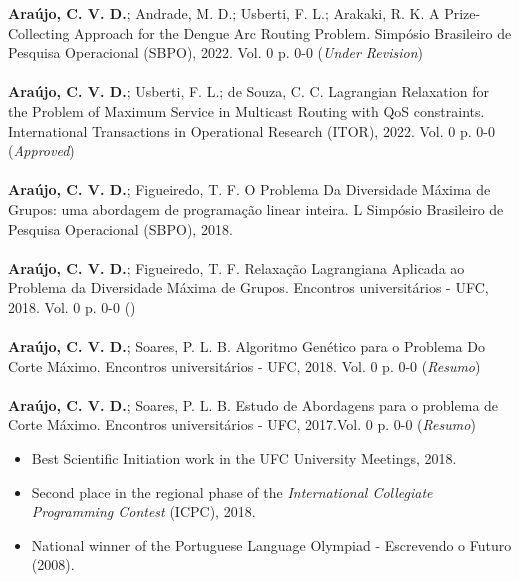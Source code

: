 \documentclass[10pt,a4paper,ragged2e,withhyper]{altacv}
\begin{document}
\begin{paracol}{1}
        \medskip
        \textbf{Araújo, C. V. D.}; Andrade, M. D.; Usberti, F. L.; Arakaki, R. K.
        \textcolor{SecondaryColor}{A Prize-Collecting Approach for the Dengue
          Arc Routing Problem}. Simpósio Brasileiro de Pesquisa Operacional
        (SBPO), 2022. Vol. 0 p. 0-0 (\emph{Under Revision}) \\
        \divider \\ 
        \textbf{Araújo, C. V. D.}; Usberti, F. L.; de Souza, C. C.
        \textcolor{SecondaryColor}{Lagrangian Relaxation for the Problem of Maximum Service in Multicast Routing with QoS constraints}. International Transactions in Operational Research (ITOR), 2022. Vol. 0 p. 0-0 (\emph{Approved}) \\
        \divider \\
        \textbf{Araújo, C. V. D.}; Figueiredo, T. F.
        \textcolor{SecondaryColor}{O Problema Da Diversidade Máxima de Grupos: uma abordagem de programação linear inteira}.  L Simpósio Brasileiro de Pesquisa Operacional (SBPO), 2018. \\
    		\divider \\
    		\textbf{Araújo, C. V. D.}; Figueiredo, T. F.
    		\textcolor{SecondaryColor}{Relaxação Lagrangiana Aplicada ao Problema da Diversidade Máxima de Grupos}. Encontros universitários - UFC, 2018. Vol. 0 p. 0-0 (\emph{}) \\
    		\divider \\
    		\textbf{Araújo, C. V. D.}; Soares, P. L. B. 
    		\textcolor{SecondaryColor}{Algoritmo Genético para o Problema Do Corte Máximo}. Encontros universitários - UFC, 2018. Vol. 0 p. 0-0 (\emph{Resumo}) \\
            \divider \\
            \textbf{Araújo, C. V. D.}; Soares, P. L. B.
            \textcolor{SecondaryColor}{Estudo de Abordagens para o problema de Corte Máximo}. Encontros universitários  - UFC, 2017.Vol. 0 p. 0-0 (\emph{Resumo}) \\
	    \medskip
        \begin{itemize}
            \item Best Scientific Initiation work in the
              \textcolor{SecondaryColor}{UFC University Meetings, 2018}.
            \item Second place in the regional phase of the \textcolor{SecondaryColor}{\textit{International Collegiate Programming Contest} (ICPC), 2018}.
            \item National winner of the \textcolor{SecondaryColor}{Portuguese
                Language Olympiad - Escrevendo o Futuro (2008)}.     
        \end{itemize}
    \end{paracol}
\end{document}
